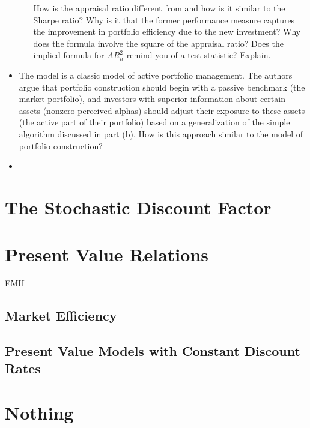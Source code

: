 \documentclass[11pt,green,twocol,citestyle=authoryear, bibstyle=authoryear]{elegantbook}
\begin{document}
\begin{problem}
\begin{itemize}
\begin{enumerate}
            How is the appraisal ratio different from and how is it similar to the Sharpe ratio? Why is it that the former performance measure captures the improvement in portfolio efficiency due to the new investment? Why does the formula involve the square of the appraisal ratio? Does the implied formula for $ AR_n^2 $ remind you of a test statistic? Explain.
        \end{enumerate} 
        \item  The \cite{Treynor_Black_1973} model is a classic model of active portfolio management. The authors argue that portfolio construction should begin with a passive benchmark (the market portfolio), and investors with superior information about certain assets (nonzero perceived alphas) should adjust their exposure to these assets (the active part of their portfolio) based on a generalization of the simple algorithm discussed in part (b). How is this approach similar to the \cite{Black_Litterman_1992} model of portfolio construction?
    \end{itemize}

\end{problem}

\begin{solution}
    \begin{itemize}
        \item 
    \end{itemize}
\end{solution}

\chapter{The Stochastic Discount Factor}

\chapter{Present Value Relations}
\begin{introduction}
    \item EMH
\end{introduction}

\section{Market Efficiency}

\section{Present Value Models with Constant Discount Rates}




\printbibliography[heading=bibintoc, title=\ebibname]


\appendix


\chapter{Nothing}
\end{document}
